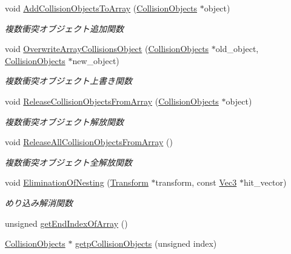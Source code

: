 \begin{DoxyCompactItemize}
void \mbox{\hyperlink{class_collision_base_ace98d75317a9f56bc6cada7980285b53}{Add\+Collision\+Objects\+To\+Array}} (\mbox{\hyperlink{class_collision_objects}{Collision\+Objects}} $\ast$object)
\begin{DoxyCompactList}\small\item\em 複数衝突オブジェクト追加関数 \end{DoxyCompactList}\item 
void \mbox{\hyperlink{class_collision_base_a4a7bba0fc9d39e27dc58d695f04cf186}{Overwrite\+Array\+Collisions\+Object}} (\mbox{\hyperlink{class_collision_objects}{Collision\+Objects}} $\ast$old\+\_\+object, \mbox{\hyperlink{class_collision_objects}{Collision\+Objects}} $\ast$new\+\_\+object)
\begin{DoxyCompactList}\small\item\em 複数衝突オブジェクト上書き関数 \end{DoxyCompactList}\item 
void \mbox{\hyperlink{class_collision_base_a46bbb58a0dd818fc172f34462b1d5b08}{Release\+Collision\+Objects\+From\+Array}} (\mbox{\hyperlink{class_collision_objects}{Collision\+Objects}} $\ast$object)
\begin{DoxyCompactList}\small\item\em 複数衝突オブジェクト解放関数 \end{DoxyCompactList}\item 
void \mbox{\hyperlink{class_collision_base_a54d52219e2bf43ed2a9b2a11813934ea}{Release\+All\+Collision\+Objects\+From\+Array}} ()
\begin{DoxyCompactList}\small\item\em 複数衝突オブジェクト全解放関数 \end{DoxyCompactList}\item 
void \mbox{\hyperlink{class_collision_base_a257660ba9ad63f8c92137fdd24ad46cb}{Elimination\+Of\+Nesting}} (\mbox{\hyperlink{class_transform}{Transform}} $\ast$transform, const \mbox{\hyperlink{_vector3_d_8h_ab16f59e4393f29a01ec8b9bbbabbe65d}{Vec3}} $\ast$hit\+\_\+vector)
\begin{DoxyCompactList}\small\item\em めり込み解消関数 \end{DoxyCompactList}\item 
unsigned \mbox{\hyperlink{class_collision_base_ac1d7000c820fabfa604138cda30a40a1}{get\+End\+Index\+Of\+Array}} ()
\item 
\mbox{\hyperlink{class_collision_objects}{Collision\+Objects}} $\ast$ \mbox{\hyperlink{class_collision_base_a542bb0a4095f4399f8dc09d0860d51ba}{getp\+Collision\+Objects}} (unsigned index)

\end{DoxyCompactItemize}

